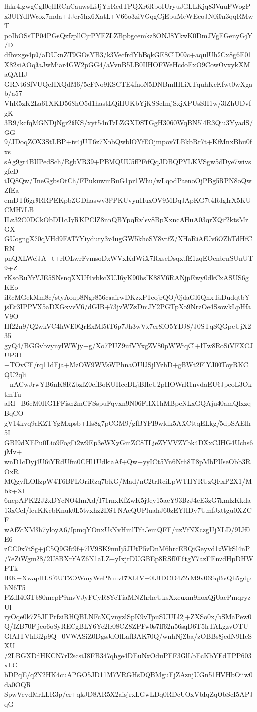 lhkr4lgwgCgI0qlIRCnCauwsLiJjYhRcdTPQXr6RboIUryuJGLLKjq83VuuFWogP
x3UlYdlWcox7mda+JJer5hx6XatL+V66o3ziVGqgCjEbuMeWEcoJN0i0n3qqRMwT
poIbOSsTP04PGsQzfzpllCjrPYEZLZBpbgcemkz8ONJ8YkwK0DmJVgEGenyGjY/D
dfbvxge4p0/aDUknZT9GOsYB3/k3VecfrdYbBqkGE8ClD09c+aqulUh2Cx8g6E01
X82siAOq9aJwMiar4GW2pGG4/aVvnB5LB0IIHOFWeHcdoExO9CowOvxykXMaQAHJ
GRNt6SfVUQcHXQdM6/5cFNo9KSCTE4fnoN5DNBmlHLiXTquhKcKfwt0wXgab/a57
VhR5zK2La61XKD56ShO5d1hastLQiHUKbYjKSScImjSxjXPUsSH1w/3lZhUDvfgK
3R9/kcfqMGNDjNgr26KS/xyt54nTzLZGXDSTGgH3060WqBN5l4R3Qiu3YyadS/GG
9/JDoqZOX3StLBP+iv4jUT6z7XnbQwblOYfEOjmpov7LBkbRr7t+KfMnxBbu0fxs
sAg9gr4BUPedSch/RgbVR39+PBMQUU5fPFrfQqJDBQPYLKVSgw5dDye7wivsgfeD
iJQ8Qw/TneGgbsOtCh/FPukuwmBuG1pr1Whu/wLqodPaenoOjPBg5RPN8oQwZfEa
emDTf6gr9RRPEKpbZGDhaswv3PPKUvynHuxOV9MDqJApKG7t4RdgIrX5KUCMH7LB
ILz32C0DCkObDI1cJyRKPClZ8nnQBYpqRylev8BpXxncAHuA03qrXQif2ktsMrGX
GUogngX30qVHd9FAT7Yiydury3v4ugGW5khoSY8vtfZ/XHoRiAfUv6OZhTdHfCRN
pnQXLWeiJA+t+rlOLwrFvmsoDxWVxKdWiX7RxseDsqxtfE1zqEOcnbrnSUnUT9+Z
rKsoRuYrVJE5SNsnqXXUf4vbkcXUJ6yK90hsIK88V6RANjpEwy0dkCxASUS6gKEo
iRcMGekMm8c/styAoup8Ngr856caairwDKzxPTeojrQO/0jdaGl6QhxTaDudqtbY
jsEr3IPPVX5aDXGxvvV6/dGIB+73jvWZzDmJY2PGTpXo9NrzOe4SsowkLpHfaV9O
Hf22n9/Q2wkVC4hWE0QrExMl5tT6p7Jh3wVk7er8iO5YD98/J0STqSQGpcUjX235
gyQ4/BGGvbvynylWWjy+g/Xo7PUZ9ufVYxgZV80pWWrqCl+lTw8RoSiVFXCJUPiD
+TOvCF/rq11dFja+MzOW9WVsWPhnaOUlJSjlYzhD+gBWt2FlYJ00ToyRKCQU2qli
+nACwJrwYB6nK8RZbzlZ0cfBoKUHceDLjBHcU2pHOWrR1nvdaEU6JpeoL3OktmTu
aRI+B6eM0HG1FFish2mCFSspuFqvxn9N06FHX1hMBpeNLxGQAju40amQlxzqBqCO
gV14kvq9aKZTYgMxpsb+Hs8g7pCGM9/gfBYPI9wldk5AXCttqELkg/5dpSAElh5I
GBI9dXEPu0Lio9FogFi2w9Ep3eWXyGmZC8TLjeZYVVZYbk4DXxCJHG4Uchs6jMv+
wnD1cDyj4U6iYRdUfm0CHl1UdkiaAf+Qw+yyICt5Yn6Nrh8T8pMbPUseObb3ROxR
MQgvfLOIlzpW4T6BPLOriRzq7bKG/Mad/nC2trRciLpWTHYRUzQRxP2X1/Mbk+XI
6ncpAPK22J2xDYcNO4ImXd/I71rnxKfZwK5j0ey15acY93BzJ4eE3zG7kmlzKkda
13xCeI/leuKKcbKnuk0L5tvxhz2DSTNAcQUPIuahJ60zEYHDy7UmfJxttgu0XZCF
wAfZtXM8h7yloyA6/IpmqYOnxUsNvHmlTfhJemQFF/uzVfNXczgUjXLD/9IJf0E6
zCC0x7tSg+jC5Q9Gfc9f+7lV9SK9nuIj5JUtP5vDnM6hrcEBQiGeyvd1zWkSl4nP
/7eZiWgm28/2U8BXrYAZ6N1aLZ+yIxjrDUGBEp8RSf0F6tgY7azFEnvdHpDHWPTk
lEK+XwapHL8f6UTZOWmyWePNmvI7XbIV+0lJIDCO4Z2rM9v06SqBvQh5gdphN6T5
PZdI403Tb80mcpP9mvVJyFCyR8YcTiaMNZhrhcUksXxeuxm9hoxQjUacPmqryzUl
ryOqe0k7Z5JIlPrfziRHQBLNFcXQvnyzlSpK9vTpuSUULl2j+ZXSo0x/bSMaPew0
Q/lZB70Fjjeo6oSyRECgBLY6Ye2lc08CZ8ZPFw0s7ff62n56sqD6T5hTALgzvOTU
GlAITVhBi2p9Q+0VWASiZ0DgsJdOlLafBAK70Q/wnhNjZba/zOBBs8jedN9HcSXU
/2LBGXDdHKCN7rI2scsiJ8FB347qhge4DEuNxOduPFF3GlLbEcKbYEdTPP603xLG
bDPqE/q2N2HK4cuAPGO5JD11M7VRGHsDQBMguFjZAznjUGn51HVHbOiiw0da0OQR
SpwVcvdMrLLR3p/er+qkJD8AR5X2aisjrxLGwLDq0RDcUOxVbIqZqObScI5APJqG
